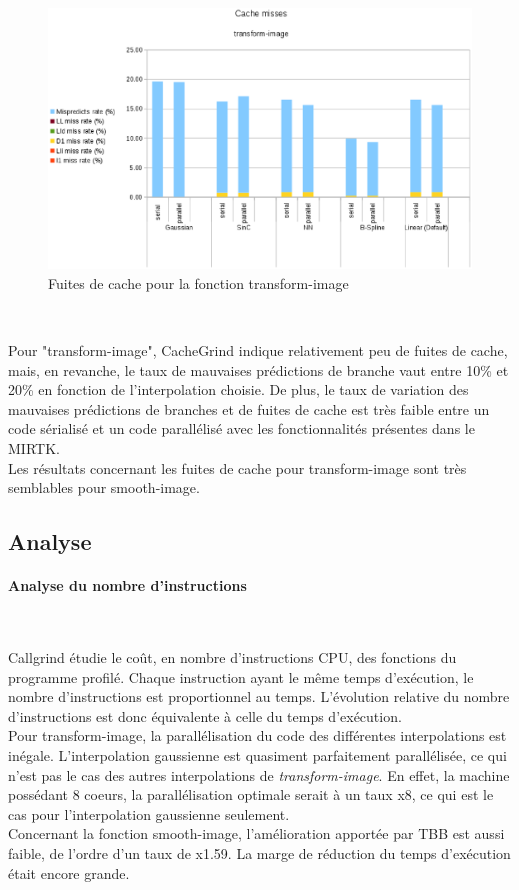 \documentclass[10pt]{report}
\begin{document}
\begin{figure}[h!]
	\begin{center}
		\includegraphics[width=15cm]{Reports/figures/cache_misses_transform_image.eps}
	\end{center}	
	\caption{Fuites de cache pour la fonction transform-image}
	\label{Fuites de cache pour la fonction transform-image}
\end{figure}~\par
Pour "transform-image", CacheGrind indique relativement peu de fuites de cache, mais, en revanche, le taux de mauvaises prédictions de branche vaut entre 10\% et 20\% en fonction de l'interpolation choisie. De plus, le taux de variation des mauvaises prédictions de branches et de fuites de cache est très faible entre un code sérialisé et un code parallélisé avec les fonctionnalités présentes dans le MIRTK.\\
Les résultats concernant les fuites de cache pour transform-image sont très semblables pour smooth-image.
\subsection{Analyse}
    \paragraph{Analyse du nombre d'instructions}~\par
Callgrind étudie le coût, en nombre d'instructions CPU, des fonctions du programme profilé. Chaque instruction ayant le même temps d'exécution, le nombre d'instructions est proportionnel au temps. L'évolution relative du nombre d'instructions est donc équivalente à celle du temps d'exécution.\\
Pour transform-image, la parallélisation du code des différentes interpolations est inégale. L'interpolation gaussienne est quasiment parfaitement parallélisée, ce qui n'est pas le cas des autres interpolations de \textit{transform-image}. En effet, la machine possédant 8 coeurs, la parallélisation optimale serait à un taux x8, ce qui est le cas pour l'interpolation gaussienne seulement.\\
Concernant la fonction smooth-image, l'amélioration apportée par TBB est aussi faible, de l'ordre d'un taux de x1.59. La marge de réduction du temps d'exécution était encore grande.
\newpage
\end{document}
